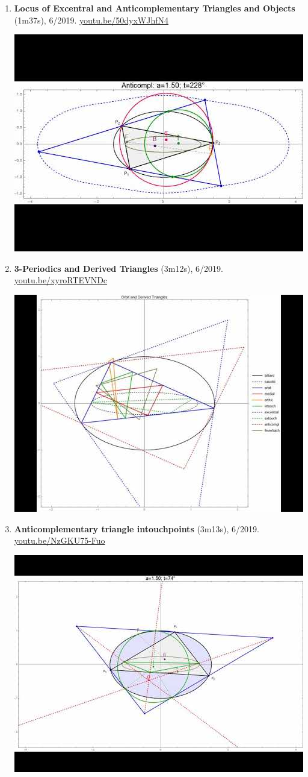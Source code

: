 \documentclass[12pt]{article}
\begin{document}
\begin{enumerate}[resume]
% 
\item \textbf{Locus of Excentral and Anticomplementary Triangles and Objects} (1m37s), 6/2019. \href{https://youtu.be/50dyxWJhfN4}{\url{youtu.be/50dyxWJhfN4}}
\begin{center}\includegraphics[width=.5\textwidth]{pics/50dyxWJhfN4.jpg}\end{center}
% 
\item \textbf{3-Periodics and Derived Triangles} (3m12s), 6/2019. \href{https://youtu.be/xyroRTEVNDc}{\url{youtu.be/xyroRTEVNDc}}
\begin{center}\includegraphics[width=.5\textwidth]{pics/xyroRTEVNDc.jpg}\end{center}
% 
\item \textbf{Anticomplementary triangle intouchpoints} (3m13s), 6/2019. \href{https://youtu.be/NzGKU75-Fuo}{\url{youtu.be/NzGKU75-Fuo}}
\begin{center}\includegraphics[width=.5\textwidth]{pics/NzGKU75-Fuo.jpg}\end{center}

\end{enumerate}
\end{document}
